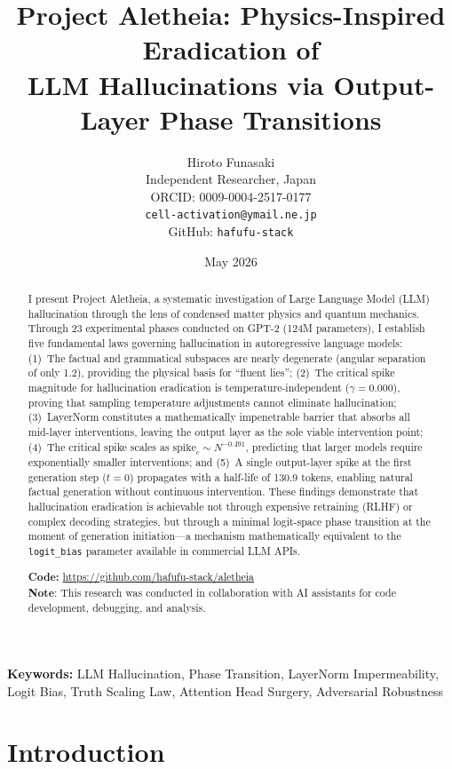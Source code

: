 \documentclass[11pt,a4paper]{article}
\title{\textbf{Project Aletheia: Physics-Inspired Eradication of\\LLM Hallucinations via Output-Layer Phase Transitions}}
\author{Hiroto Funasaki\\
Independent Researcher, Japan\\
ORCID: 0009-0004-2517-0177\\
\texttt{cell-activation@ymail.ne.jp}\\
GitHub: \texttt{hafufu-stack}
}
\date{May 2026}
\begin{document}
\maketitle

\begin{abstract}
I present Project Aletheia, a systematic investigation of Large Language Model (LLM) hallucination through the lens of condensed matter physics and quantum mechanics. Through 23 experimental phases conducted on GPT-2 (124M parameters), I establish five fundamental laws governing hallucination in autoregressive language models:
(1)~The factual and grammatical subspaces are nearly degenerate (angular separation of only 1.2\textdegree), providing the physical basis for ``fluent lies'';
(2)~The critical spike magnitude for hallucination eradication is temperature-independent ($\gamma = 0.000$), proving that sampling temperature adjustments cannot eliminate hallucination;
(3)~LayerNorm constitutes a mathematically impenetrable barrier that absorbs all mid-layer interventions, leaving the output layer as the sole viable intervention point;
(4)~The critical spike scales as $\text{spike}_c \sim N^{-0.491}$, predicting that larger models require exponentially smaller interventions; and
(5)~A single output-layer spike at the first generation step ($t=0$) propagates with a half-life of 130.9 tokens, enabling natural factual generation without continuous intervention.
These findings demonstrate that hallucination eradication is achievable not through expensive retraining (RLHF) or complex decoding strategies, but through a minimal logit-space phase transition at the moment of generation initiation---a mechanism mathematically equivalent to the \texttt{logit\_bias} parameter available in commercial LLM APIs.

\medskip
\noindent\textbf{Code:} \url{https://github.com/hafufu-stack/aletheia}\\
\textbf{Note}: This research was conducted in collaboration with AI assistants for code development, debugging, and analysis.
\end{abstract}

\textbf{Keywords:} LLM Hallucination, Phase Transition, LayerNorm Impermeability, Logit Bias, Truth Scaling Law, Attention Head Surgery, Adversarial Robustness

\tableofcontents
\newpage

\section{Introduction}
\end{document}
